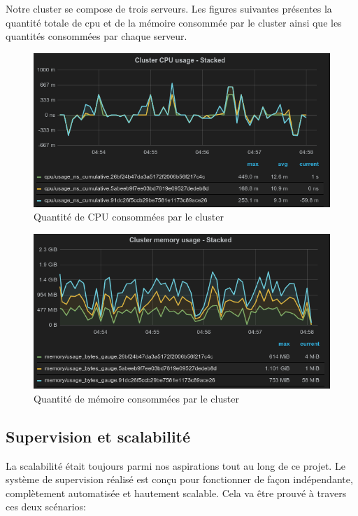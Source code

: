 \begin{onehalfspace}
Notre cluster se compose de trois serveurs. Les figures suivantes présentes la quantité totale de \acrshort{cpu} et de la mémoire consommée par le cluster ainsi que les quantités consommées par chaque serveur.

\begin{figure}[H]
\centering
\includegraphics [scale=0.6]{chapitre5/assets/cluster-cpu}
\caption{Quantité de CPU consommées par le cluster}
\label{fig:}
\end{figure}

\begin{figure}[H]
\centering
\includegraphics [scale=0.6]{chapitre5/assets/cluster-memory}
\caption{Quantité de mémoire consommées par le cluster}
\label{fig:}
\end{figure}


\subsection{Supervision et scalabilité}

La scalabilité était toujours parmi nos aspirations tout au long de ce projet. Le système de supervision réalisé est conçu pour fonctionner de façon indépendante, complètement automatisée et hautement scalable. Cela va être prouvé à travers ces deux scénarios:


\end{onehalfspace}
